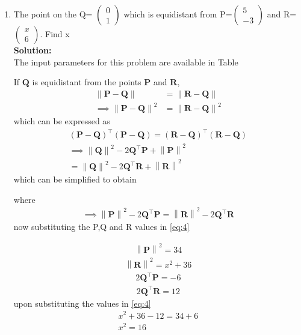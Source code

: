 \documentclass[12pt]{article}
\providecommand{\brak}[1]{\ensuremath{\left(#1\right)}}
\providecommand{\norm}[1]{\left\lVert#1\right\rVert}
\newcommand{\solution}{\noindent \textbf{Solution: }}
\newcommand{\myvec}[1]{\ensuremath{\begin{pmatrix}#1\end{pmatrix}}}
\let\vec\mathbf
\begin{document}
\begin{enumerate}

\item The point on the Q= $\myvec{0\\ 1}$ which is equidistant from P=$\myvec{5 \\ -3}$ and R=$\myvec{x\\6}$. Find x\\

\solution \\The input parameters for this problem are available in Table
\begin{table}[ht!]

\caption{}
\label{Table-1}	
\end{table}


  If $\vec{Q}$  is  equidistant from the points $\vec{P}$ and $\vec{R}$, 
\begin{align}
 \norm{\vec{P}-\vec{Q}} &=
\norm{\vec{R}-\vec{Q}} 
\\
 \implies \norm{\vec{P}-\vec{Q}}^2 &=
\norm{\vec{R}-\vec{Q}}^2 
\end{align}
which can be expressed as 
\begin{multline}
 \brak{\vec{P}-\vec{Q}}^{\top} \brak{\vec{P}-\vec{Q}}=
 \brak{\vec{R}-\vec{Q}}^{\top} 
\brak{\vec{R}-\vec{Q}}
\\
 \implies \norm{\vec{Q}}^2-2{\vec{Q}}^{\top}\vec{P} + \norm{\vec{P}}^2
 \\= \norm{\vec{Q}}^2-2{\vec{Q}}^{\top}\vec{R} + \norm{\vec{R}}^2
\end{multline}
which can be simplified to obtain
  
  where 
  \begin{align}
   \implies \norm{\vec{P}}^2-2{\vec{Q}}^{\top}\vec{P} = \norm{\vec{R}}^2-2{\vec{Q}}^{\top}\vec{R} 
\label{eq:4} 
  \end{align}
  now substituting the P,Q and R values in \eqref{eq:4}

  \begin{align}
   \norm{\vec{P}}^2 = 34
    \end{align}
 \begin{align}
   \norm{\vec{R}}^2 = x^2+36
    \end{align}
  \begin{align}
 2{\vec{Q}}^{\top}\vec{P}= -6
\end{align}
\begin{align}
 2{\vec{Q}}^{\top}\vec{R}= 12
\end{align}
upon   substituting the values in \eqref{eq:4}
\begin{align}
 x^2+36-12=34+6
 \\x^2=16
\end{align}


\end{enumerate}
\end{document}
